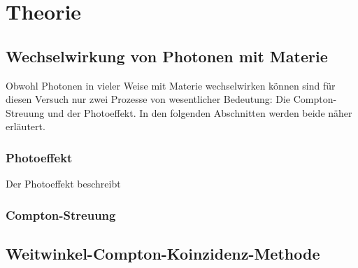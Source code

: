 \section{Theorie}

\subsection{Wechselwirkung von Photonen mit Materie}

Obwohl Photonen in vieler Weise mit Materie wechselwirken können sind für diesen Versuch nur zwei Prozesse von wesentlicher Bedeutung: Die Compton-Streuung und der Photoeffekt. In den folgenden Abschnitten werden beide näher erläutert.

\subsubsection{Photoeffekt}

Der Photoeffekt beschreibt

\subsubsection{Compton-Streuung}

\subsection{Weitwinkel-Compton-Koinzidenz-Methode}
